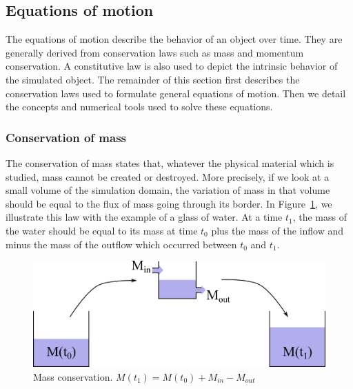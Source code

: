 \subsection{Equations of motion}
\label{subsec:starMechanics_motionEquation}
The equations of motion describe the behavior of an object over time.
They are generally derived from conservation laws such as mass and momentum conservation. 
A constitutive law is also used to depict the intrinsic behavior of the simulated object.
The remainder of this section first describes the conservation laws used to formulate general equations of motion.
Then we detail the concepts and numerical tools used to solve these equations.

\subsubsection{Conservation of mass}
\label{subsubsec:starMechanics_massConservation}
The conservation of mass states that, whatever the physical material which is studied, mass cannot be created or destroyed.
More precisely, if we look at a small volume of the simulation domain, the variation of mass in that volume should be equal to the flux of mass going through its border.
In Figure~\ref{fig:massConservation}, we illustrate this law with the example of a glass of water.
At a time $t_{1}$, the mass of the water should be equal to its mass at time $t_{0}$ plus the mass of the inflow and minus the mass of the outflow which occurred between $t_{0}$ and $t_{1}$.
\begin{figure}[!h]
	\centering
	\includegraphics[width=\linewidth]{images/continuum_mechanics/massConservation.png}
	\caption[STAR mechanics: Mass conservation]{\label{fig:massConservation} Mass conservation. $M(t_{1}) = M(t_{0}) + M_{in} - M_{out}$}
\end{figure}

